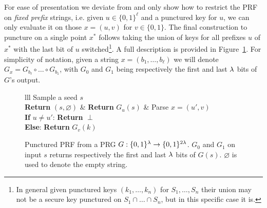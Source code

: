 For ease of presentation we deviate from \cite{CCS:KPTZ13} and only show how to restrict the PRF on \textit{fixed prefix} strings, i.e. given $u \in \{0,1\}^\ell$ and a punctured key for $u$, we can only evaluate it on those $x = (u, v)$ for $v \in \{0,1\}$.
The final construction to puncture on a single point $x^\ast$ follows taking the union of keys for all prefixes $u$ of $x^\ast$ with the last bit of $u$ switched\footnote{In general given punctured keys $(k_1, \ldots, k_n)$ for $S_1, \ldots, S_n$ their union may not be a secure key punctured on $S_1 \cap \ldots \cap S_n$, but in this specific case it is.}.
A full description is provided in Figure~\ref{prot:KPTZ13:prefix_punctured_prf}.
For simplicity of notation, given a string $x = (b_1, \ldots, b_\ell)$ we will denote $G_x = G_{b_\ell} \circ \ldots \circ G_{b_1}$, with $G_0$ and $G_1$ being respectively the first and last $\lambda$ bits of $G$'s output.

\begin{figure}[htb]
\centering
\begin{pcarray}{lll}
		{
			Sample a seed $s$
				\\
			\textbf{Return} $(s, \varnothing)$
		}
		&
		{
			\textbf{Return} $G_u(s)$
		}
		&
		{
			Parse $x = (u', v)$
				\\
			\textbf{If} $u \neq u'$: \textbf{Return} $\perp$
				\\
			\textbf{Else}: \textbf{Return} $G_{v}(k)$
		}
\end{pcarray}
\caption{Punctured PRF from a PRG $G: \{0,1\}^\lambda \to \{0,1\}^{2\lambda}$. $G_0$ and $G_1$ on input $s$ returns respectively the first and last $\lambda$ bits of $G(s)$. $\varnothing$ is used to denote the empty string.}
\label{prot:KPTZ13:prefix_punctured_prf}
\end{figure}

